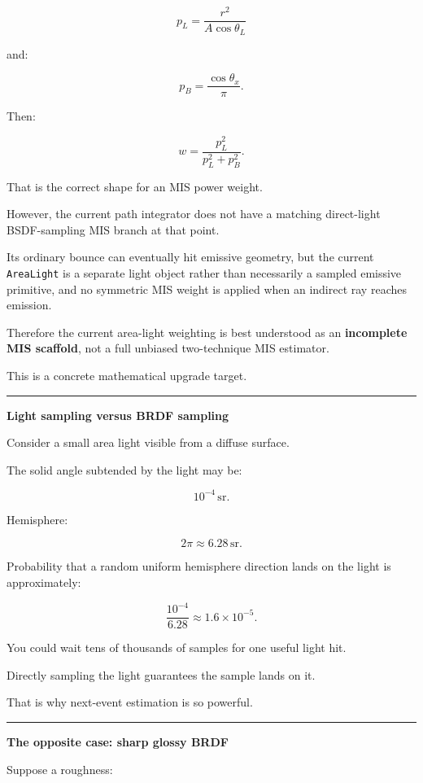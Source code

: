\[
p_L
=
\frac{r^2}
{A\cos\theta_L}
\]

and:

\[
p_B=
\frac{\cos\theta_x}{\pi}.
\]

Then:

\[
w=
\frac{p_L^2}{p_L^2+p_B^2}.
\]

That is the correct shape for an MIS power weight.

However, the current path integrator does not have a matching direct-light BSDF-sampling MIS branch at that point.

Its ordinary bounce can eventually hit emissive geometry, but the current \texttt{AreaLight} is a separate light object rather than necessarily a sampled emissive primitive, and no symmetric MIS weight is applied when an indirect ray reaches emission.

Therefore the current area-light weighting is best understood as an \textbf{incomplete MIS scaffold}, not a full unbiased two-technique MIS estimator.

This is a concrete mathematical upgrade target.

\begin{center}\rule{0.5\linewidth}{0.5pt}\end{center}

\textbf{Light sampling versus BRDF sampling}

Consider a small area light visible from a diffuse surface.

The solid angle subtended by the light may be:

\[
10^{-4}\,\text{sr}.
\]

Hemisphere:

\[
2\pi\approx6.28\,\text{sr}.
\]

Probability that a random uniform hemisphere direction lands on the light is approximately:

\[
\frac{10^{-4}}{6.28}
\approx1.6\times10^{-5}.
\]

You could wait tens of thousands of samples for one useful light hit.

Directly sampling the light guarantees the sample lands on it.

That is why next-event estimation is so powerful.

\begin{center}\rule{0.5\linewidth}{0.5pt}\end{center}

\textbf{The opposite case: sharp glossy BRDF}

Suppose a roughness:

